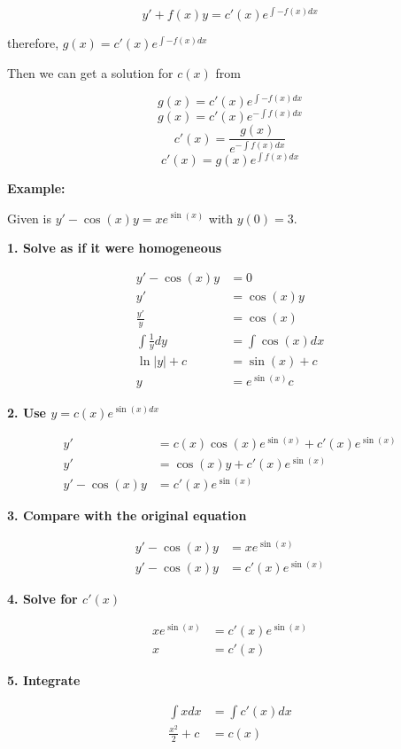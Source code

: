 \[
    y' + f(x)y = c'(x)e^{\int -f(x) dx}
\]

therefore, \(g(x) = c'(x)e^{\int -f(x) dx}\)

Then we can get a solution for \(c(x)\) from

\[
    g(x) = c'(x)e^{\int -f(x) dx}
\]
\[
    g(x) = c'(x)e^{-\int f(x) dx}
\]
\[
    c'(x) = \frac{g(x)}{e^{-\int f(x) dx}}
\]
\[
    c'(x) = g(x)e^{\int f(x) dx}
\]

\textbf{Example: }

Given is \(y' -\cos(x)y = x e^{\sin(x)}\) with \(y(0) = 3\).

\textbf{1. Solve as if it were homogeneous}

\begin{align*}
    y' -\cos(x)y &= 0\\
    y' &= \cos(x)y\\
    \frac{y'}{y} &= \cos(x)\\
    \int\frac{1}{y}dy &= \int \cos(x)dx \\
    \ln |y| + c &= \sin(x) + c \\
    y &= e^{\sin(x)}c 
\end{align*}

\textbf{2. Use \(y = c(x)e^{\sin(x)dx}\)}

\begin{align*}
    y' &= c(x)\cos(x)e^{\sin(x)} + c'(x)e^{\sin(x)}\\
    y' &= \cos(x)y + c'(x)e^{\sin(x)}\\
    y' - \cos(x)y &= c'(x)e^{\sin(x)}
\end{align*}
    
\textbf{3. Compare with the original equation}

\begin{align*}
    y' -\cos(x)y &= x e^{\sin(x)}\\
    y' - \cos(x)y &= c'(x)e^{\sin(x)}
\end{align*}

\textbf{4. Solve for \(c'(x)\)}

\begin{align*}
    xe^{\sin(x)} &= c'(x)e^{\sin(x)}\\
    x &= c'(x)
\end{align*}

\textbf{5. Integrate}

\begin{align*}
    \int x dx &= \int c'(x)dx\\
    \frac{x^2}{2} + c &= c(x)
\end{align*}

